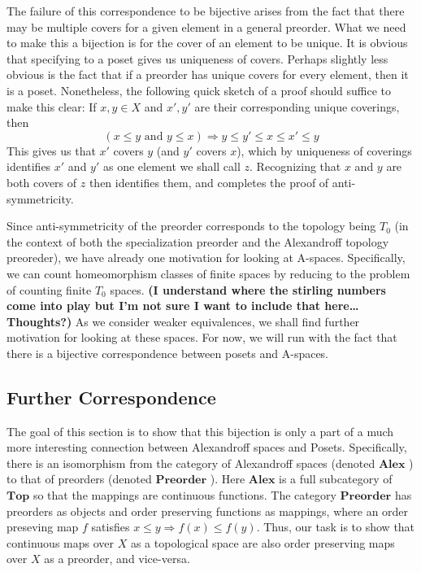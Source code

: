 \documentclass[paper=a4, fontsize=11pt]{scrartcl} %
\numberwithin{equation}{section} %
\numberwithin{figure}{section} %
\numberwithin{table}{section} %
\theoremstyle{definition}
\theoremstyle{remark}
\newcommand{\cat}[1]{\ensuremath{\mathbf{#1}} }
\newcommand{\Pre}{\cat{Preorder}}
\newcommand{\Al}{\cat{Alex}}
\newcommand{\Top}{\cat{Top}}
\begin{document}
The failure of this correspondence to be bijective arises from the fact that there may be multiple covers for a given element in a general preorder.
What we need to make this a bijection is for the cover of an element to be unique. 
It is obvious that specifying to a poset gives us uniqueness of covers.
Perhaps slightly less obvious is the fact that if a preorder has unique covers for every element, then it is a poset.
Nonetheless, the following quick sketch of a proof should suffice to make this clear: If $x,y\in X$ and $x',y'$ are their corresponding unique coverings, then $$(x\leq y \text{ and } y\leq x)\Rightarrow y\leq y'\leq x\leq x' \leq y$$
This gives us that $x'$ covers $y$ (and $y'$ covers $x$), which by uniqueness of coverings identifies $x'$ and $y'$ as one element we shall call $z$.
Recognizing that $x$ and $y$ are both covers of $z$ then identifies them, and completes the proof of anti-symmetricity.

Since anti-symmetricity of the preorder corresponds to the topology being $T_0$ (in the context of both the specialization preorder and the Alexandroff topology preoreder), we have already one motivation for looking at A-spaces.
Specifically, we can count homeomorphism classes of finite spaces by reducing to the problem of counting finite $T_0$ spaces.
\textbf{ (I understand where the stirling numbers come into play but I'm not sure I want to include that here\dots Thoughts?)}
As we consider weaker equivalences, we shall find further motivation for looking at these spaces.
For now, we will run with the fact that there is a bijective correspondence between posets and A-spaces.
\subsection{Further Correspondence}
The goal of this section is to show that this bijection is only a part of a much more interesting connection between Alexandroff spaces and Posets.
Specifically, there is an isomorphism from the category of Alexandroff spaces (denoted \Al) to that of preorders (denoted \Pre).
Here \Al is a full subcategory of \Top so that the mappings are continuous functions.
The category \Pre has preorders as objects and order preserving functions as mappings, where an order preseving map $f$ satisfies $x\leq y\Rightarrow f(x)\leq f(y)$. 
Thus, our task is to show that continuous maps over $X$ as a topological space are also order preserving maps over $X$ as a preorder, and vice-versa.
\end{document}
